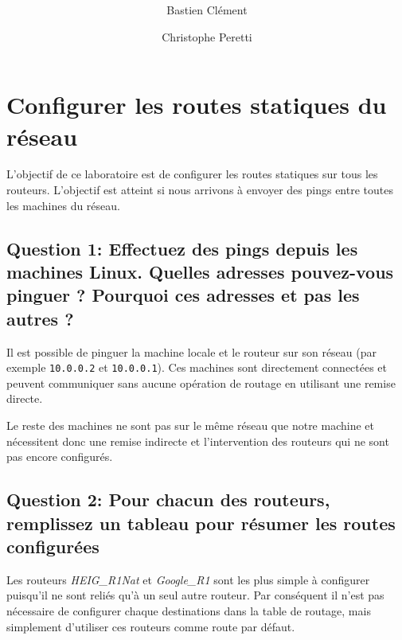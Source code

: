 \documentclass[11pt,a4paper]{article}
\author{Bastien Clément \and Christophe Peretti}
\title{{\normalsize \doccourse} \\ \doctitle }
\begin{document}
\maketitle
\vspace{1em}

\section{Configurer les routes statiques du réseau}

L'objectif de ce laboratoire est de configurer les routes statiques sur tous les routeurs. L'objectif est atteint si nous arrivons à envoyer des pings entre toutes les machines du réseau.

\subsection{Question 1: Effectuez des pings depuis les machines Linux. Quelles adresses pouvez-vous pinguer ? Pourquoi ces adresses et pas les autres ?}

Il est possible de pinguer la machine locale et le routeur sur son réseau (par exemple \texttt{10.0.0.2} et \texttt{10.0.0.1}). Ces machines sont directement connectées et peuvent communiquer sans aucune opération de routage en utilisant une remise directe.

Le reste des machines ne sont pas sur le même réseau que notre machine et nécessitent donc une remise indirecte et l'intervention des routeurs qui ne sont pas encore configurés.

\subsection{Question 2: Pour chacun des routeurs, remplissez un tableau pour résumer les routes configurées}

Les routeurs \textit{HEIG\_R1Nat} et \textit{Google\_R1} sont les plus simple à configurer puisqu'il ne sont reliés qu'à un seul autre routeur. Par conséquent il n'est pas nécessaire de configurer chaque destinations dans la table de routage, mais simplement d'utiliser ces routeurs comme route par défaut.

\vspace{0.5cm}
\end{document}
